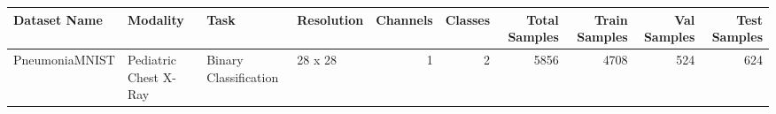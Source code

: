 \begin{tabular}{llllrrrrrr}
\toprule
Dataset Name & Modality & Task & Resolution & Channels & Classes & Total Samples & Train Samples & Val Samples & Test Samples \\
\midrule
PneumoniaMNIST & Pediatric Chest X-Ray & Binary Classification & 28 x 28 & 1 & 2 & 5856 & 4708 & 524 & 624 \\
\bottomrule
\end{tabular}
